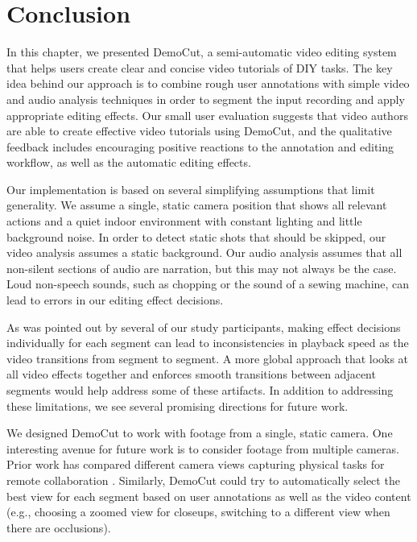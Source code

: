 \section{Conclusion}

In this chapter, we presented DemoCut, a semi-automatic video editing
system that helps users create clear and concise video tutorials of
DIY tasks. The key idea behind our approach is to combine rough user
annotations with simple video and audio analysis techniques in order
to segment the input recording and apply appropriate editing
effects. Our small user evaluation suggests that video authors are
able to create effective video tutorials using DemoCut, and the
qualitative feedback includes encouraging positive reactions to the
annotation and editing workflow, as well as the automatic editing
effects.


Our implementation is based on several simplifying assumptions that
limit generality. We assume a single, static camera position that
shows all relevant actions and a quiet indoor environment with
constant lighting and little background noise. In order to detect static shots  that should be skipped, our video analysis assumes a static background. Our audio analysis assumes that all non-silent sections of audio are narration, but this may not always be the case. Loud non-speech sounds, such as chopping or the sound of a sewing machine, can lead to errors in our editing effect decisions.

As was pointed out by several of our study participants, making effect decisions individually for each segment can lead to inconsistencies in playback speed as the video transitions from segment to segment. A more global approach that looks at all video effects together and enforces  smooth transitions between adjacent segments would help address some of these artifacts.
%
In addition to addressing these limitations, we see several promising
directions for future work.

 We designed DemoCut to work with
footage from a single, static camera. One interesting avenue for
future work is to consider footage from multiple cameras. Prior work has compared different camera views capturing physical
tasks for remote collaboration \cite{Fussell:2003te,Ranjan:2007}. Similarly, DemoCut could try to automatically select the best view for
each segment based on user annotations as well as the video content
(e.g., choosing a zoomed view for closeups, switching to a
different view when there are occlusions). %

